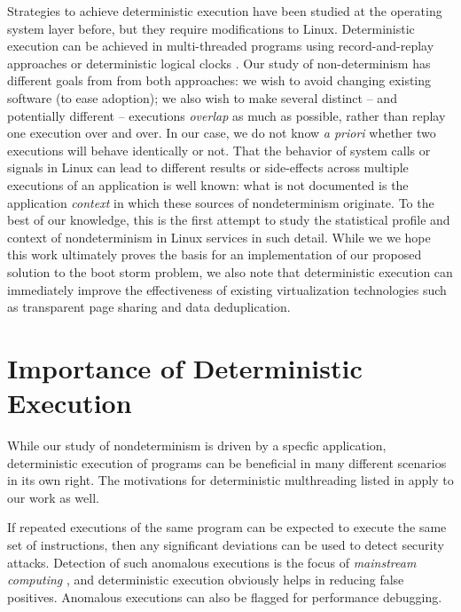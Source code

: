 Strategies to achieve deterministic execution have been studied at the operating system layer \cite{bergan2010dos} before,
but they require modifications to Linux. Deterministic execution can be achieved in multi-threaded programs 
using record-and-replay approaches \cite{patil2010pinplay} or deterministic logical clocks \cite{marek2011scaling}. 
Our study of non-determinism has different goals from from both approaches: we wish to avoid changing existing 
software (to ease adoption); we also wish to make several distinct -- and potentially different -- executions \emph{overlap} as much as possible, 
rather than replay one execution over and over. In our case, we do not know \emph{a priori} whether two executions 
will behave identically or not. That the behavior of system calls or signals in Linux can lead to different results or side-effects across
multiple executions of an application is well known: what is not documented is the application \emph{context} in
which these sources of nondeterminism originate. To the best of our knowledge, this is
the first attempt to study the statistical profile and context of nondeterminism in Linux services
in such detail. While we we hope
this work ultimately proves the basis for an implementation of our proposed solution to the boot storm
problem, we also note that deterministic execution can immediately improve
the effectiveness of existing virtualization technologies such as transparent page sharing
and data deduplication.

\section{Importance of Deterministic Execution}
While our study of nondeterminism is driven by a specfic application,
 deterministic execution of programs can be beneficial in many
different scenarios in its own right. 
The motivations for deterministic multhreading listed in
\cite{marek2011scaling, patil2010pinplay} apply to our work as well. \newline

If repeated executions of the same program can be
expected to execute the same set of instructions, then
any significant deviations can be used to detect security
attacks. Detection of such
anomalous executions is the focus of \emph{mainstream computing} \cite{stephenson2010mainstream},
and deterministic execution obviously helps in reducing false
positives. 
Anomalous executions can also be flagged for performance
debugging. \newline

